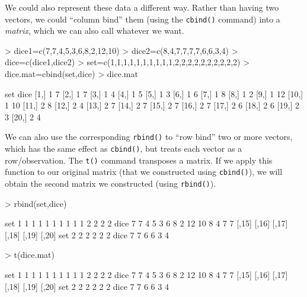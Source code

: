\documentclass[12pt]{article}
\begin{document}
We could also represent these data a different way. Rather than having two vectors, we could ``column bind'' them (using the \verb|cbind()| command) into a \emph{matrix}, which we can also call whatever we want.
\begin{Schunk}
\begin{Sinput}
> dice1=c(7,7,4,5,3,6,8,2,12,10)
> dice2=c(8,4,7,7,7,7,6,6,3,4)
> dice=c(dice1,dice2)
> set=c(1,1,1,1,1,1,1,1,1,1,2,2,2,2,2,2,2,2,2,2)
> dice.mat=cbind(set,dice)
> dice.mat
\end{Sinput}
\begin{Soutput}
      set dice
 [1,]   1    7
 [2,]   1    7
 [3,]   1    4
 [4,]   1    5
 [5,]   1    3
 [6,]   1    6
 [7,]   1    8
 [8,]   1    2
 [9,]   1   12
[10,]   1   10
[11,]   2    8
[12,]   2    4
[13,]   2    7
[14,]   2    7
[15,]   2    7
[16,]   2    7
[17,]   2    6
[18,]   2    6
[19,]   2    3
[20,]   2    4
\end{Soutput}
\end{Schunk}

We can also use the corresponding \verb|rbind()| to ``row bind'' two or more vectors, which has the same effect as \verb|cbind()|, but treats each vector as a row/observation. The \verb|t()| command transposes a matrix. If we apply this function to our original matrix (that we constructed using \verb|cbind()|), we will obtain the second matrix we constructed (using \verb|rbind()|).
\begin{Schunk}
\begin{Sinput}
> rbind(set,dice)
\end{Sinput}
\begin{Soutput}
     [,1] [,2] [,3] [,4] [,5] [,6] [,7] [,8] [,9] [,10] [,11] [,12] [,13] [,14]
set     1    1    1    1    1    1    1    1    1     1     2     2     2     2
dice    7    7    4    5    3    6    8    2   12    10     8     4     7     7
     [,15] [,16] [,17] [,18] [,19] [,20]
set      2     2     2     2     2     2
dice     7     7     6     6     3     4
\end{Soutput}
\begin{Sinput}
> t(dice.mat)
\end{Sinput}
\begin{Soutput}
     [,1] [,2] [,3] [,4] [,5] [,6] [,7] [,8] [,9] [,10] [,11] [,12] [,13] [,14]
set     1    1    1    1    1    1    1    1    1     1     2     2     2     2
dice    7    7    4    5    3    6    8    2   12    10     8     4     7     7
     [,15] [,16] [,17] [,18] [,19] [,20]
set      2     2     2     2     2     2
dice     7     7     6     6     3     4
\end{Soutput}
\end{Schunk}
\end{document}
